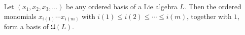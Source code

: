 
Let $(x_1, x_2, x_3, \ldots)$ be any ordered basis of a Lie algebra $L$. Then the ordered monomials $x_{i(1)} \cdots x_{i(m)}$ with $i(1) \leq i(2) \leq \cdots \leq i(m)$, together with $1$, form a basis of $\mathfrak{U}(L)$.
